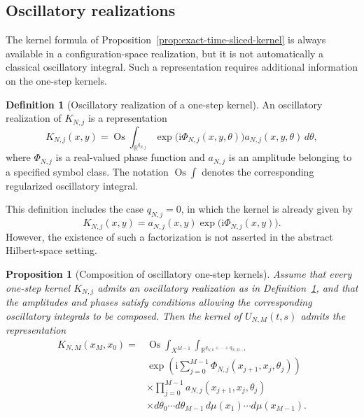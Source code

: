 \documentclass[11pt]{amsart}
\theoremstyle{plain}
\newtheorem{proposition}[theorem]{Proposition}
\theoremstyle{definition}
\newtheorem{definition}[theorem]{Definition}
\theoremstyle{remark}
\begin{document}
\subsection{Oscillatory realizations}
\label{subsec:oscillatory-realizations}

The kernel formula of
Proposition~\ref{prop:exact-time-sliced-kernel} is always available in a
configuration-space realization, but it is not automatically a classical
oscillatory integral. Such a representation requires additional information
on the one-step kernels.

\begin{definition}[Oscillatory realization of a one-step kernel]
\label{def:oscillatory-one-step-kernel}
An oscillatory realization of \(K_{N,j}\) is a representation
\[
K_{N,j}(x,y)
=
\operatorname{Os}
\int_{\mathbb{R}^{q_{N,j}}}
\exp\bigl(\mathrm{i}\Phi_{N,j}(x,y,\theta)\bigr)
a_{N,j}(x,y,\theta)\,d\theta,
\]
where \(\Phi_{N,j}\) is a real-valued phase function and
\(a_{N,j}\) is an amplitude belonging to a specified symbol class.
The notation \(\operatorname{Os}\int\) denotes the corresponding
regularized oscillatory integral.
\end{definition}

This definition includes the case \(q_{N,j}=0\), in which the kernel is
already given by
\[
K_{N,j}(x,y)
=
a_{N,j}(x,y)
\exp\bigl(\mathrm{i}\Phi_{N,j}(x,y)\bigr).
\]
However, the existence of such a factorization is not asserted in the
abstract Hilbert-space setting.

\begin{proposition}[Composition of oscillatory one-step kernels]
\label{prop:composition-oscillatory-kernels}
Assume that every one-step kernel \(K_{N,j}\) admits an oscillatory
realization as in
Definition~\ref{def:oscillatory-one-step-kernel}, and that the amplitudes and
phases satisfy conditions allowing the corresponding oscillatory integrals
to be composed. Then the kernel of \(U_{N,M}(t,s)\) admits the representation
\[
\begin{split}
K_{N,M}(x_{M},x_{0})
={}&
\operatorname{Os}
\int_{X^{M-1}}
\int_{\mathbb{R}^{q_{N,0}+\cdots+q_{N,M-1}}}
\\
&\exp\left(
\mathrm{i}
\sum_{j=0}^{M-1}
\Phi_{N,j}(x_{j+1},x_{j},\theta_{j})
\right)
\\
&\times
\prod_{j=0}^{M-1}
a_{N,j}(x_{j+1},x_{j},\theta_{j})
\\
&\times
d\theta_{0}\cdots d\theta_{M-1}
\,d\mu(x_{1})\cdots d\mu(x_{M-1}).
\end{split}
\]
\end{proposition}
\end{document}
